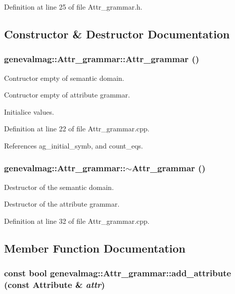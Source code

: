 Definition at line 25 of file Attr\_\-grammar.h.

\subsection{Constructor \& Destructor Documentation}
\hypertarget{classgenevalmag_1_1Attr__grammar_4163922d72d60143cd36008ab7f7abce}{
\subsubsection[{Attr\_\-grammar}]{\setlength{\rightskip}{0pt plus 5cm}genevalmag::Attr\_\-grammar::Attr\_\-grammar ()}}
\label{classgenevalmag_1_1Attr__grammar_4163922d72d60143cd36008ab7f7abce}


Contructor empty of semantic domain.

Contructor empty of attribute grammar. 

Initialice values. 

Definition at line 22 of file Attr\_\-grammar.cpp.

References ag\_\-initial\_\-symb, and count\_\-eqs.\hypertarget{classgenevalmag_1_1Attr__grammar_4655bdc8253f4d480fd68441363a3cd0}{
\subsubsection[{$\sim$Attr\_\-grammar}]{\setlength{\rightskip}{0pt plus 5cm}genevalmag::Attr\_\-grammar::$\sim$Attr\_\-grammar ()}}
\label{classgenevalmag_1_1Attr__grammar_4655bdc8253f4d480fd68441363a3cd0}


Destructor of the semantic domain.

Destructor of the attribute grammar. 

Definition at line 32 of file Attr\_\-grammar.cpp.

\subsection{Member Function Documentation}
\hypertarget{classgenevalmag_1_1Attr__grammar_4ccf3523a20ea3e646942af93a9df7e2}{
\subsubsection[{add\_\-attribute}]{\setlength{\rightskip}{0pt plus 5cm}const bool genevalmag::Attr\_\-grammar::add\_\-attribute (const {\bf Attribute} \& {\em attr})}}
\label{classgenevalmag_1_1Attr__grammar_4ccf3523a20ea3e646942af93a9df7e2}



